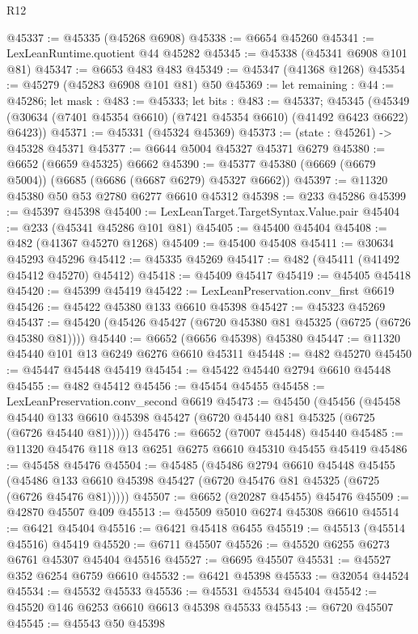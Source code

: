 \begin{lexlean}{R12}
\begin{coremodule}
@45337 := @45335 (@45268 @6908)
@45338 := @6654 @45260
@45341 := LexLeanRuntime.quotient @44 @45282
@45345 := @45338 (@45341 @6908 @101 @81)
@45347 := @6653 @483 @483
@45349 := @45347 (@41368 @1268)
@45354 := @45279 (@45283 @6908 @101 @81) @50
@45369 := let remaining : @44 := @45286;
  let mask : @483 := @45333;
  let bits : @483 := @45337;
  @45345 (@45349 (@30634 (@7401 @45354 @6610) (@7421 @45354 @6610) (@41492 @6423 @6622) @6423))
@45371 := @45331 (@45324 @45369)
@45373 := (state : @45261) -> @45328 @45371
@45377 := @6644 @5004 @45327 @45371 @6279
@45380 := @6652 (@6659 @45325) @6662
@45390 := @45377 @45380 (@6669 (@6679 @5004)) (@6685 (@6686 (@6687 @6279) @45327 @6662))
@45397 := @11320 @45380 @50 @53 @2780 @6277 @6610 @45312
@45398 := @233 @45286
@45399 := @45397 @45398
@45400 := LexLeanTarget.TargetSyntax.Value.pair
@45404 := @233 (@45341 @45286 @101 @81)
@45405 := @45400 @45404
@45408 := @482 (@41367 @45270 @1268)
@45409 := @45400 @45408
@45411 := @30634 @45293 @45296
@45412 := @45335 @45269
@45417 := @482 (@45411 (@41492 @45412 @45270) @45412)
@45418 := @45409 @45417
@45419 := @45405 @45418
@45420 := @45399 @45419
@45422 := LexLeanPreservation.conv_first @6619
@45426 := @45422 @45380 @133 @6610 @45398
@45427 := @45323 @45269
@45437 := @45420 (@45426 @45427 (@6720 @45380 @81 @45325 (@6725 (@6726 @45380 @81))))
@45440 := @6652 (@6656 @45398) @45380
@45447 := @11320 @45440 @101 @13 @6249 @6276 @6610 @45311
@45448 := @482 @45270
@45450 := @45447 @45448 @45419
@45454 := @45422 @45440 @2794 @6610 @45448
@45455 := @482 @45412
@45456 := @45454 @45455
@45458 := LexLeanPreservation.conv_second @6619
@45473 := @45450
    (@45456
      (@45458 @45440 @133 @6610 @45398 @45427 (@6720 @45440 @81 @45325 (@6725 (@6726 @45440 @81)))))
@45476 := @6652 (@7007 @45448) @45440
@45485 := @11320 @45476 @118 @13 @6251 @6275 @6610 @45310 @45455 @45419
@45486 := @45458 @45476
@45504 := @45485
    (@45486
      @2794
      @6610
      @45448
      @45455
      (@45486 @133 @6610 @45398 @45427 (@6720 @45476 @81 @45325 (@6725 (@6726 @45476 @81)))))
@45507 := @6652 (@20287 @45455) @45476
@45509 := @42870 @45507 @409
@45513 := @45509 @5010 @6274 @45308 @6610
@45514 := @6421 @45404
@45516 := @6421 @45418 @6455
@45519 := @45513 (@45514 @45516) @45419
@45520 := @6711 @45507
@45526 := @45520 @6255 @6273 @6761 @45307 @45404 @45516
@45527 := @6695 @45507
@45531 := @45527 @352 @6254 @6759 @6610
@45532 := @6421 @45398
@45533 := @32054 @44524
@45534 := @45532 @45533
@45536 := @45531 @45534 @45404
@45542 := @45520 @146 @6253 @6610 @6613 @45398 @45533
@45543 := @6720 @45507
@45545 := @45543 @50 @45398

\end{coremodule}
\end{lexlean}
